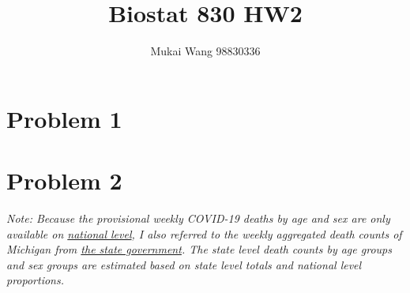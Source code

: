 \documentclass[12pt]{article}
\title{Biostat 830 HW2}
\date{}
\author{Mukai Wang 98830336}
\begin{document}
\maketitle

\section*{Problem 1}

 

\section*{Problem 2}
\emph{Note: Because the provisional weekly COVID-19 deaths by age and sex are only available on \href{https://data.cdc.gov/NCHS/Provisional-COVID-19-Deaths-by-Week-Sex-and-Age/vsak-wrfu}{national level}, I also referred to the weekly aggregated death counts of Michigan from \href{https://www.michigan.gov/coronavirus/-/media/Project/Websites/coronavirus/Michigan-Data/10-04-2022/Datasets/Cases-and-Deaths-by-County-and-by-Date-of-Symptom-Onset-or-by-Date-of-Death2022-10-04.xlsx?rev=d9568cd19a45423aac6c03af0ce87707&hash=EF2BBF61BD1BFFB0E9F20527E91DCC47}{the state government}. The state level death counts by age groups and sex groups are estimated based on state level totals and national level proportions.}  
\end{document}
